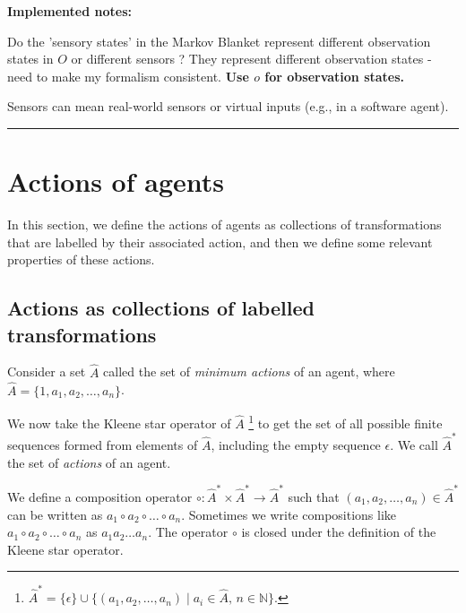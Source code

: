 {\textbf{Implemented notes:}
\begin{compactitem}
    \item Do the 'sensory states' in the Markov Blanket represent different observation states in $O$ or different sensors ? They represent different observation states - need to make my formalism consistent. \textbf{Use $o$ for observation states.}
    \item Sensors can mean real-world sensors or virtual inputs (e.g., in a software agent).
\end{compactitem}
\noindent\rule{\textwidth}{1mm}
}

\section{Actions of agents}

In this section, we define the actions of agents as collections of transformations that are labelled by their associated action, and then we define some relevant properties of these actions.

\subsection{Actions as collections of labelled transformations}

Consider a set $\hat{A}$ called the set of \emph{minimum actions} of an agent, where $\hat{A} = \{1, a_{1}, a_{2}, \dots, a_{n}\}$.

We now take the Kleene star operator of $\hat{A}$ \footnote{
$\hat{A}^{\ast} = \{ \epsilon \} \cup \{ (a_1, a_2, \dots, a_n) \mid a_i \in \hat{A}, \, n \in \mathbb{N} \}$.
} to get the set of all possible finite sequences formed from elements of $\hat{A}$, including the empty sequence $\epsilon$.
We call $\hat{A}^{\ast}$ the set of \emph{actions} of an agent.

We define a composition operator $\circ: \hat{A}^{\ast} \times \hat{A}^{\ast} \to \hat{A}^{\ast}$ such that $(a_1, a_2, \dots, a_n) \in \hat{A}^{\ast}$ can be written as $a_1 \circ a_2 \circ \dots \circ a_n$.
Sometimes we write compositions like $a_1 \circ a_2 \circ \dots \circ a_n$ as $a_1 a_2 \dots a_n$.
The operator $\circ$ is closed under the definition of the Kleene star operator.

